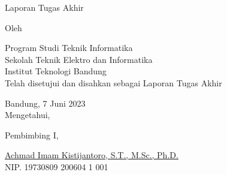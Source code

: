 \clearpage
\pagestyle{empty}

\begin{center}
    \smallskip

    \Large \bfseries \MakeUppercase{\thetitle}
    \vfill

    \Large Laporan Tugas Akhir
    \vfill

    \large Oleh

    \Large \theauthor

    \large Program Studi Teknik Informatika \\

    \normalsize \normalfont
    Sekolah Teknik Elektro dan Informatika \\
    Institut Teknologi Bandung \\

    \vfill
    \normalsize \normalfont
    Telah disetujui dan disahkan sebagai Laporan Tugas Akhir

    \vfill
    \normalsize \normalfont
    Bandung, 7 Juni 2023 \\
    Mengetahui,

    \vspace{0.5cm}
    Pembimbing I,

    \vfill
    \underline{Achmad Imam Kistijantoro, S.T., M.Sc., Ph.D.} \\
    NIP. 19730809 200604 1 001

\end{center}
\clearpage
